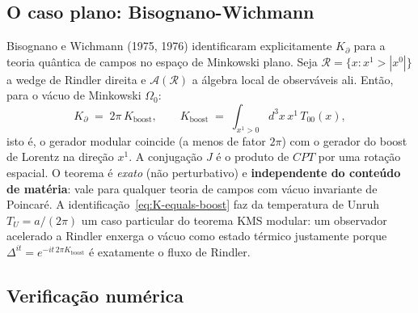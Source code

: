 \documentclass[12pt,a4paper]{article}
\newcommand{\Kpartial}{K_{\partial}}
\begin{document}
\subsection{O caso plano: Bisognano-Wichmann}
\label{sec:bisognano-wichmann}

Bisognano e Wichmann (1975, 1976) identificaram explicitamente $\Kpartial$
para a teoria quântica de campos no espaço de Minkowski plano.  Seja
$\mathcal{R} = \{x : x^{1} > |x^{0}|\}$ a wedge de Rindler direita e
$\mathcal{A}(\mathcal{R})$ a álgebra local de observáveis ali.  Então, para
o vácuo de Minkowski $\Omega_{0}$:
\begin{equation}
\Kpartial \;=\; 2\pi \, K_{\text{boost}},
\qquad
K_{\text{boost}} \;=\; \int_{x^{1} > 0} d^{3}x \, x^{1} \, T_{00}(x),
\label{eq:K-equals-boost}
\end{equation}
isto é, o gerador modular coincide (a menos de fator $2\pi$) com o gerador
do boost de Lorentz na direção $x^{1}$.  A conjugação $J$ é o produto de
$CPT$ por uma rotação espacial.  O teorema é \emph{exato} (não
perturbativo) e \textbf{independente do conteúdo de matéria}: vale para
qualquer teoria de campos com vácuo invariante de Poincaré.  A
identificação~\eqref{eq:K-equals-boost} faz da temperatura de Unruh
$T_{U} = a/(2\pi)$ um caso particular do teorema KMS modular: um observador
acelerado a Rindler enxerga o vácuo como estado térmico justamente porque
$\Delta^{it} = e^{-it\,2\pi K_{\text{boost}}}$ é exatamente o fluxo de Rindler.

\subsection{Verificação numérica}
\label{sec:typeIII1-numerical}
\end{document}
